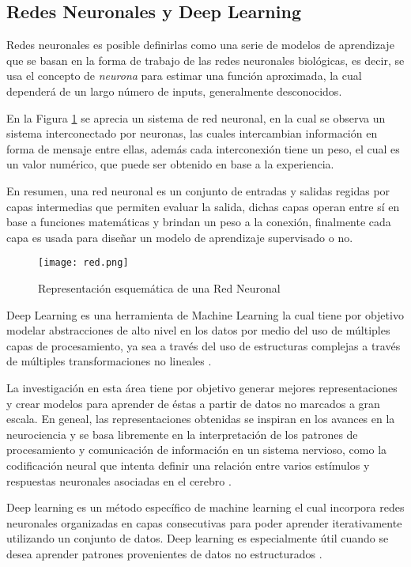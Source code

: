 \subsection{Redes Neuronales y Deep Learning}

Redes neuronales es posible definirlas como una serie de modelos de aprendizaje que se basan en la forma de trabajo de las redes neuronales biológicas, es decir, se usa el concepto de \textit{neurona} para estimar una función aproximada, la cual dependerá de un largo número de inputs, generalmente desconocidos.

En la Figura \ref{red} se aprecia un sistema de red neuronal, en la cual se observa un sistema interconectado por neuronas, las cuales intercambian información en forma de mensaje entre ellas, además cada interconexión tiene un peso, el cual es un valor numérico, que puede ser obtenido en base a la experiencia.

En resumen, una red neuronal es un conjunto de entradas y salidas regidas por capas intermedias que permiten evaluar la salida, dichas capas operan entre sí en base a funciones matemáticas y brindan un peso a la conexión, finalmente cada capa es usada para diseñar un modelo de aprendizaje supervisado o no.

\begin{figure}[!h]
	\centering
	\texttt{[image: red.png]}
	\caption{Representación esquemática de una Red Neuronal}
	\label{red}
\end{figure} 

Deep Learning es una herramienta de Machine Learning la cual tiene por objetivo modelar abstracciones de alto nivel en los datos por medio del uso de múltiples capas de procesamiento, ya sea a través del uso de estructuras complejas a través de múltiples transformaciones no lineales \cite{bengio2013representation, MAL-006, SIG-039}. 

La investigación en esta área tiene por objetivo generar mejores representaciones y crear modelos para aprender de éstas a partir de datos no marcados a gran escala. En geneal, las representaciones obtenidas se inspiran en los avances en la neurociencia y se basa libremente en la interpretación de los patrones de procesamiento y comunicación de información en un sistema nervioso, como la codificación neural que intenta definir una relación entre varios estímulos y respuestas neuronales asociadas en el cerebro \cite{MAL-006}.

Deep learning es un método específico de machine learning el cual incorpora redes neuronales organizadas en capas consecutivas para poder aprender iterativamente utilizando un conjunto de datos. Deep learning es especialmente útil cuando se desea aprender patrones provenientes de datos no estructurados \cite{SIG-039}.


